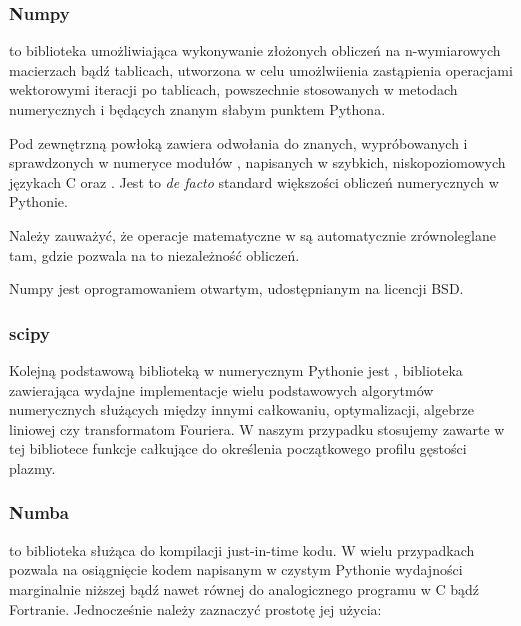     \subsubsection{Numpy}
     to biblioteka umożliwiająca wykonywanie złożonych obliczeń na n-wymiarowych macierzach
    bądź tablicach, utworzona w celu umożlwiienia zastąpienia operacjami wektorowymi iteracji po tablicach,
    powszechnie stosowanych w metodach numerycznych i będących znanym słabym punktem Pythona.

    Pod zewnętrzną powłoką zawiera odwołania do
    znanych, wypróbowanych i sprawdzonych w numeryce modułów , 
    napisanych w szybkich, niskopoziomowych językach C oraz .
    Jest to \emph{de facto}
    standard większości obliczeń numerycznych w Pythonie.

    Należy zauważyć, że operacje matematyczne w  są automatycznie zrównoleglane 
    tam, gdzie pozwala na to niezależność obliczeń.

    Numpy jest oprogramowaniem otwartym, udostępnianym na licencji BSD. 

    \subsubsection{scipy}
    Kolejną podstawową biblioteką w numerycznym Pythonie jest , biblioteka
    zawierająca wydajne implementacje wielu podstawowych algorytmów numerycznych służących
    między innymi całkowaniu, optymalizacji, algebrze liniowej czy transformatom Fouriera.
    W naszym przypadku stosujemy zawarte w tej bibliotece funkcje całkujące do określenia
    początkowego profilu gęstości plazmy.

    \subsubsection{Numba}
     to biblioteka służąca do kompilacji just-in-time kodu.
    W wielu przypadkach
    pozwala na osiągnięcie kodem napisanym w czystym Pythonie wydajności marginalnie
    niższej bądź nawet równej do analogicznego programu w C bądź Fortranie. 
    Jednocześnie należy zaznaczyć prostotę jej użycia:



